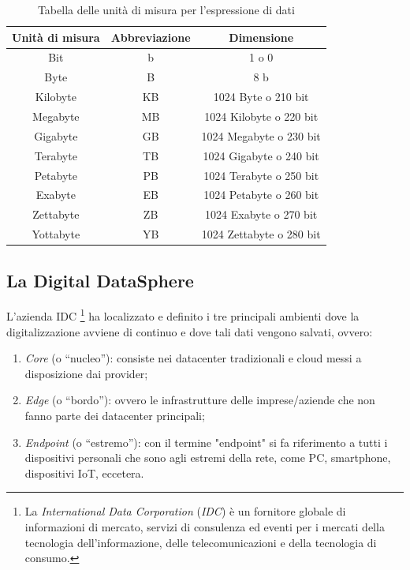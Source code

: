 \begin{table}[hbt!]
    \centering
    \begin{tabular}{ccc}
        \hline
        Unità di misura & Abbreviazione & Dimensione\\
        \hline
        Bit & b & 1 o 0\\
        Byte & B & 8 b\\
        Kilobyte & KB & 1024 Byte o 210 bit\\
        Megabyte & MB & 1024 Kilobyte o 220 bit\\
        Gigabyte & GB & 1024 Megabyte o 230 bit\\
        Terabyte & TB & 1024 Gigabyte o 240 bit\\
        Petabyte & PB & 1024 Terabyte o 250 bit\\
        Exabyte & EB & 1024 Petabyte o 260 bit\\
        Zettabyte & ZB & 1024 Exabyte o 270 bit\\
        Yottabyte & YB & 1024 Zettabyte o 280 bit\\
    \end{tabular}
    \caption{Tabella delle unità di misura per l'espressione di dati}
    \label{tab:data_measures}
\end{table}

\subsection{La Digital DataSphere}

L'azienda IDC \footnote{La \textit{International Data Corporation} (\textit{IDC}) è un fornitore globale di informazioni di mercato, servizi di consulenza ed eventi per i mercati della tecnologia dell'informazione, delle telecomunicazioni e della tecnologia di consumo.} ha localizzato e definito i tre principali ambienti dove la digitalizzazione avviene di continuo e dove tali dati vengono salvati, ovvero:~\cite{idc_digital_datasphere}

\begin{enumerate}
    \item \textit{Core} (o “nucleo”): consiste nei datacenter tradizionali e cloud messi a disposizione dai provider;
    \item \textit{Edge} (o “bordo”): ovvero le infrastrutture delle imprese/aziende che non fanno parte dei datacenter principali; 
    \item \textit{Endpoint} (o “estremo”): con il termine "endpoint" si fa riferimento a tutti i dispositivi personali che sono agli estremi della rete, come PC, smartphone, dispositivi IoT, eccetera. 
\end{enumerate}

